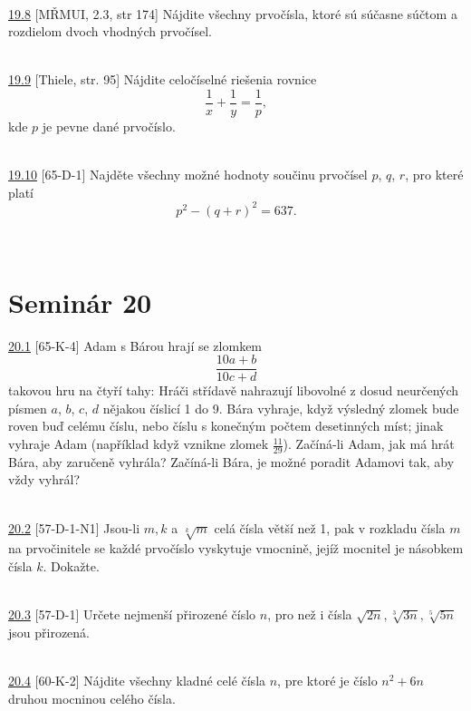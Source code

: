 \\

\noindent \ul{19.8} [MŘMUI, 2.3, str 174] Nájdite všechny prvočísla, ktoré sú súčasne súčtom a rozdielom dvoch vhodných prvočísel.


\\

\noindent \ul{19.9} [Thiele, str. 95] Nájdite celočíselné riešenia rovnice $$\frac{1}{x}+\frac{1}{y}=\frac{1}{p},$$ kde $p$ je pevne dané prvočíslo.


\\

\noindent \ul{19.10} [65-D-1]
Najděte všechny možné hodnoty součinu prvočísel $p$, $q$, $r$, pro které platí
$$p^2 - (q + r)^2= 637.$$


\\

\section*{Seminár 20}

\noindent \ul{20.1} [65-K-4] Adam s Bárou hrají se zlomkem
$$ \frac{10a + b}{10c + d}$$ takovou hru na čtyří tahy: Hráči střídavě nahrazují libovolné z dosud
neurčených písmen $a$, $b$, $c$, $d$ nějakou číslicí 1 do 9. Bára vyhraje, když výsledný zlomek bude
roven buď celému číslu, nebo číslu s konečným počtem desetinných míst; jinak vyhraje Adam (například
když vznikne zlomek $\frac{11}{29}$). Začíná-li Adam, jak má hrát Bára, aby zaručeně vyhrála?
Začíná-li Bára, je možné poradit Adamovi tak, aby vždy vyhrál?


\\

\noindent \ul{20.2} [57-D-1-N1] Jsou-li $m, k$ a $\sqrt[k]{m}$ celá čísla větší než 1, pak v
rozkladu čísla $m$ na prvočinitele se každé prvočíslo vyskytuje vmocnině, jejíž mocnitel je násobkem
čísla $k$. Dokažte.


\\

\noindent \ul{20.3} [57-D-1]
Určete nejmenší přirozené číslo $n$, pro než i čísla
$\sqrt{2n}, \sqrt[3]{3n}, \sqrt[5]{5n}$ jsou přirozená.


\\

\noindent \ul{20.4} [60-K-2]
Nájdite všechny kladné celé čísla $n$, pre ktoré je číslo $n^2 + 6n$ druhou mocninou celého čísla.


\\


